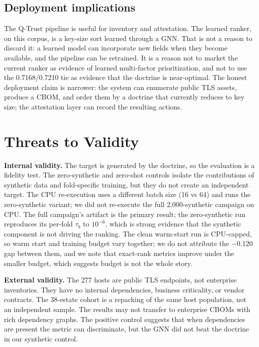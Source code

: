 \documentclass[conference,10pt]{IEEEtran}
\newcommand{\tb}{\tau_b}
\begin{document}
\subsection{Deployment implications}
The Q-Trust pipeline is useful for inventory and attestation. The learned ranker, on this
corpus, is a key-size sort learned through a GNN. That is not a reason to discard it: a learned
model can incorporate new fields when they become available, and the pipeline can be retrained.
It is a reason not to market the current ranker as evidence of learned multi-factor
prioritization, and not to use the 0.7168/0.7210 tie as evidence that the doctrine is
near-optimal. The honest deployment claim is narrower: the system can enumerate public TLS
assets, produce a CBOM, and order them by a doctrine that currently reduces to key size; the
attestation layer can record the resulting actions.

\section{Threats to Validity}
\label{sec:threats}

\textbf{Internal validity.} The target is generated by the doctrine, so the evaluation is a
fidelity test. The zero-synthetic and zero-shot controls isolate the contributions of synthetic
data and fold-specific training, but they do not create an independent target. The CPU
re-execution uses a different batch size (16 vs 64) and runs the zero-synthetic variant; we did
not re-execute the full 2{,}000-synthetic campaign on CPU. The full campaign's artifact is the
primary result; the zero-synthetic run reproduces its per-fold $\tb$ to $10^{-6}$, which is
strong evidence that the synthetic component is not driving the ranking. The clean warm-start
run is CPU-capped, so warm start and training budget vary together; we do not attribute the
$-0.120$ gap between them, and we note that exact-rank metrics improve under the smaller budget,
which suggests budget is not the whole story.

\textbf{External validity.} The 277 hosts are public TLS endpoints, not enterprise inventories.
They have no internal dependencies, business criticality, or vendor contracts. The 38-estate
cohort is a repacking of the same host population, not an independent sample. The results may
not transfer to enterprise CBOMs with rich dependency graphs. The positive control suggests that
when dependencies are present the metric can discriminate, but the GNN did not beat the doctrine
in our synthetic control.
\end{document}
